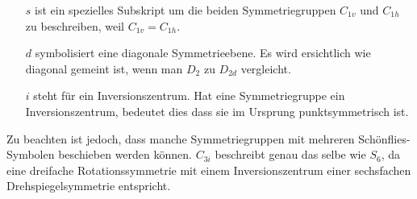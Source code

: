 \begin{itemize}
\begin{itemize}
       \item[\(s\)] ist ein spezielles Subskript um die beiden Symmetriegruppen \(C_{1v}\) und \(C_{1h}\) zu beschreiben, weil \(C_{1v} = C_{1h}\).
       \item[\(d\)] symbolisiert eine diagonale Symmetrieebene.
         Es wird ersichtlich wie diagonal gemeint ist, wenn man \(D_2\) zu \(D_{2d}\) vergleicht.
       \item[\(i\)] steht für ein Inversionszentrum. Hat eine Symmetriegruppe ein Inversionszentrum, bedeutet dies dass sie im Ursprung punktsymmetrisch ist.
%
     \end{itemize}
 \end{itemize}
Zu beachten ist jedoch, dass manche Symmetriegruppen mit mehreren Schönflies-Symbolen beschieben werden können.
 \(C_{3i}\) beschreibt genau das selbe wie \(S_6\), da eine dreifache Rotationssymmetrie mit einem Inversionszentrum einer sechsfachen Drehspiegelsymmetrie entspricht.




